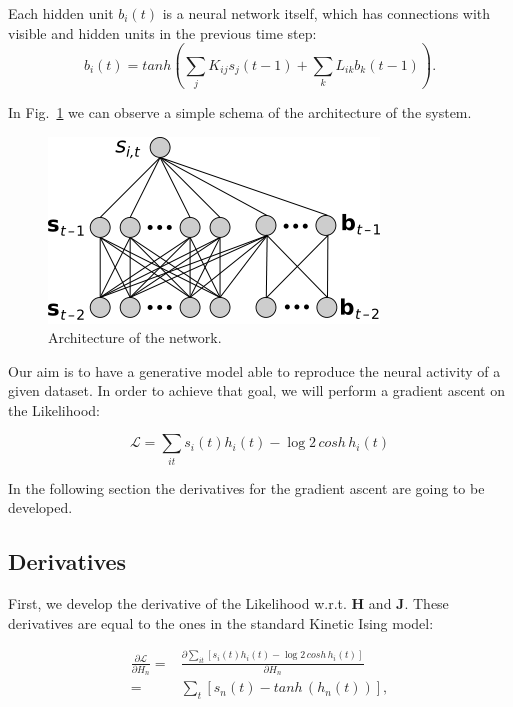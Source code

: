 \documentclass{article}
\def\*#1{\mathbf{#1}}
\begin{document}
Each hidden unit $b_i(t)$ is a neural network itself, which has connections with visible and hidden units in the previous time step:
\begin{equation}
    b_i(t) = tanh {\left ( \sum_j K_{ij} s_j(t-1) + \sum_k L_{ik} b_k(t-1) \right )}.
\end{equation}

In Fig.~\ref{fig:net_arch} we can observe a simple schema of the architecture of the system.

\begin{figure}[ht]
    \centering
    \includegraphics[width=0.3\linewidth]{images/Hidden_Architecture.png}
    \caption{Architecture of the network.}
     \label{fig:net_arch}
\end{figure}

Our aim is to have a generative model able to reproduce the neural activity of a given dataset. In order to achieve that goal, we will perform a gradient ascent on the Likelihood:

\begin{equation}
   \mathcal{L} = \sum_{i t} s_{i}(t) h_{i}(t) - \log{ 2 \, cosh \, h_{i}(t)}
   \label{eq:Likelihood}
\end{equation}

In the following section the derivatives for the gradient ascent are going to be developed.


\subsection{Derivatives}

First, we develop the derivative of the Likelihood w.r.t. $\*H$ and $\*J$. These derivatives are equal to the ones in the standard Kinetic Ising model:

\begin{align}
    \frac{\partial\mathcal{L}}{\partial H_n} =& \frac{\partial \sum_{it} \left [ s_{i}(t) h_{i}(t) - \log{ 2 \, cosh \, h_{i}(t)} \right ]}{\partial H_n}
    \\ =&  \sum_{t} \left [ s_{n}(t) - tanh \,\left ( h_n(t) \right ) \right ],
\end{align}
\end{document}
